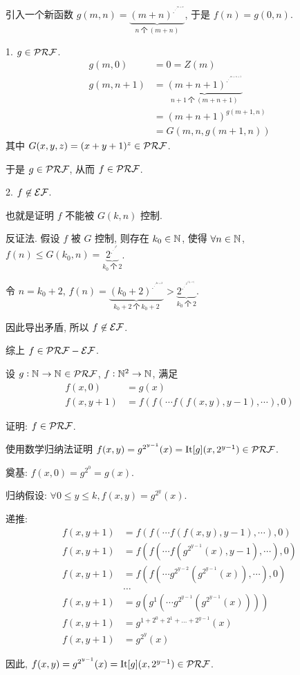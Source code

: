 \begin{solution}
引入一个新函数 $g(m, n) = \underbrace{(m+n)^{{.}^{{.}^{{.}^{m+n}}}}}_{n ~ \text{个} ~ (m+n)}$, 于是 $f(n) = g(0, n)$.

1. $g \in \mathcal{PRF}$.
\begin{align*}
g(m, 0) & = 0 = Z(m) \\
g(m, n + 1) & = \underbrace{(m+n+1)^{{.}^{{.}^{{.}^{m+n+1}}}}}_{n+1 ~ \text{个} ~ (m+n+1)} \\
& = (m + n + 1)^{g(m+1, n)} \\
& = G(m, n, g(m + 1, n))
\end{align*}
其中 $G(x, y, z) = (x + y + 1)^z \in \mathcal{PRF}$.

于是 $g \in \mathcal{PRF}$, 从而 $f \in \mathcal{PRF}$.

2. $f \not\in \mathcal{EF}$.

也就是证明 $f$ 不能被 $G(k, n)$ 控制.

反证法. 假设 $f$ 被 $G$ 控制, 则存在 $k_0 \in \mathbb{N}^{}$, 使得 $\forall n \in \mathbb{N}^{}$, $f(n) \le G(k_0, n) = \underbrace{2^{{.}^{{.}^{{.}^{2^n}}}}}_{k_0 ~ \text{个} ~ 2}$.

令 $n = k_0 + 2$, $f(n) = \underbrace{(k_0+2)^{{.}^{{.}^{{.}^{k_0+2}}}}}_{k_0+2 ~ \text{个} ~ k_0+2} > \underbrace{2^{{.}^{{.}^{{.}^{2^(k_0+2)}}}}}_{k_0 ~ \text{个} ~ 2}$.

因此导出矛盾, 所以 $f \not\in \mathcal{EF}$.

综上 $f \in \mathcal{PRF} - \mathcal{EF}$.
\end{solution}

\begin{problem}
设 $g : \mathbb{N}^{} \to \mathbb{N}^{} \in \mathcal{PRF}$, $f : \mathbb{N}^{2} \to \mathbb{N}^{}$, 满足
\begin{align*}
f(x,0) & = g(x) \\
f(x,y+1) & = f(f(\cdots f(f(x,y),y-1), \cdots), 0)
\end{align*}

证明: $f \in \mathcal{PRF}$.
\end{problem}

\begin{solution}
使用数学归纳法证明 $f(x,y) = g^{2^{y - 1}}(x) = \operatorname{It}[g] (x, 2^{y - 1}) \in \mathcal{PRF}$.

奠基: $f(x, 0) = g^{2^0} = g(x)$.

归纳假设: $\forall 0 \le y \le k, f(x,y) = g^{2^{y}}(x)$.

递推:
\begin{align*}
f(x,y+1) & = f(f(\cdots f(f(x,y),y-1), \cdots), 0) \\
f(x,y+1) & = f(f(\cdots f(g^{2^{y-1}}(x),y-1), \cdots), 0) \\
f(x,y+1) & = f(f(\cdots g^{2^{y-2}}(g^{2^{y-1}}(x)), \cdots), 0) \\
& \dots \\
f(x,y+1) & = g(g^{1}(\cdots g^{2^{y-1}}(g^{2^{y-1}}(x)))) \\
f(x,y+1) & = g^{1 + 2^0 + 2^1 + \dots + 2^{y-1}}(x) \\
f(x,y+1) & = g^{2^{y}}(x)
\end{align*}

因此, $f(x,y) = g^{2^{y - 1}}(x) = \operatorname{It}[g] (x, 2^{y - 1}) \in \mathcal{PRF}$.
\end{solution}

